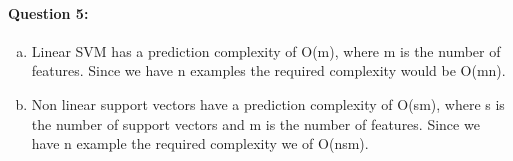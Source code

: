 \documentclass[letterpaper,11pt]{article}
\begin{document}
\paragraph{Question 5:}
\begin{enumerate}[(a)]
\item
Linear SVM has a prediction complexity of O(m), where m is the number of features. Since we have n examples the required complexity would be O(mn).
\item
Non linear support vectors have a prediction complexity of O(sm), where s is the number of support vectors and m is the number of features. Since we have n example the required complexity we of O(nsm).

\end{enumerate}
\end{document}
